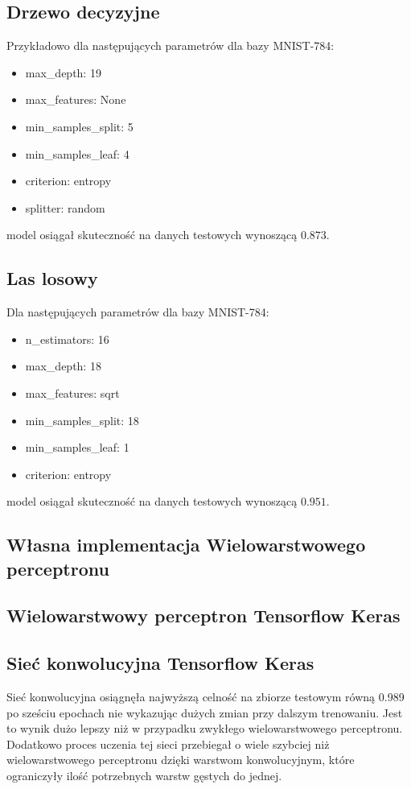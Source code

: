 \documentclass{article}
\begin{document}
\subsection{Drzewo decyzyjne}
Przykładowo dla następujących parametrów dla bazy MNIST-784:

\begin{itemize}
    \item max\_depth: 19
    \item max\_features: None
    \item min\_samples\_split: 5
    \item min\_samples\_leaf: 4
    \item criterion: entropy
    \item splitter: random
\end{itemize}
model osiągał skuteczność na danych testowych wynoszącą $0.873$.
\subsection{Las losowy}

Dla następujących parametrów dla bazy MNIST-784:

\begin{itemize}
    \item n\_estimators: 16
    \item max\_depth: 18
    \item max\_features: sqrt
    \item min\_samples\_split: 18
    \item min\_samples\_leaf: 1
    \item criterion: entropy
\end{itemize}
model osiągał skuteczność na danych testowych wynoszącą $0.951$.

\subsection{Własna implementacja Wielowarstwowego perceptronu}
\subsection{Wielowarstwowy perceptron Tensorflow Keras}
\subsection{Sieć konwolucyjna Tensorflow Keras}

Sieć konwolucyjna osiągnęła najwyższą celność na zbiorze testowym równą 0.989 po 
sześciu epochach nie wykazując dużych zmian przy dalszym 
trenowaniu. Jest to wynik dużo lepszy niż w przypadku zwykłego wielowarstwowego 
perceptronu. Dodatkowo proces uczenia tej sieci przebiegał o wiele szybciej niż 
wielowarstwowego perceptronu dzięki warstwom konwolucyjnym, które ograniczyły ilość 
potrzebnych warstw gęstych do jednej.
\end{document}
